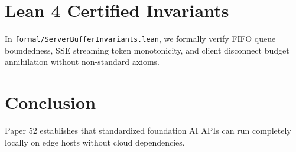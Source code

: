 \documentclass[10pt,twocolumn,letterpaper]{article}
\begin{document}
\section{Lean 4 Certified Invariants}
In \texttt{formal/ServerBufferInvariants.lean}, we formally verify FIFO queue boundedness, SSE streaming token monotonicity, and client disconnect budget annihilation without non-standard axioms.

\section{Conclusion}
Paper 52 establishes that standardized foundation AI APIs can run completely locally on edge hosts without cloud dependencies.
\end{document}
